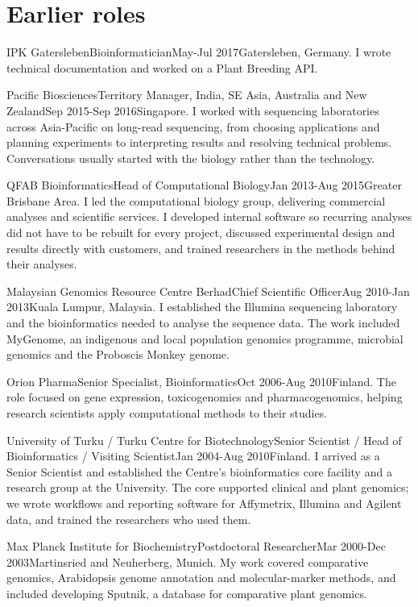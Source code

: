 \documentclass{vitae}
\begin{document}
\section{Earlier roles}
\begin{CvEntry}{IPK Gatersleben}{Bioinformatician}{May-Jul 2017}{Gatersleben, Germany. I wrote technical documentation and worked on a Plant Breeding API.}\end{CvEntry}
\begin{CvEntry}{Pacific Biosciences}{Territory Manager, India, SE Asia, Australia and New Zealand}{Sep 2015-Sep 2016}{Singapore. I worked with sequencing laboratories across Asia-Pacific on long-read sequencing, from choosing applications and planning experiments to interpreting results and resolving technical problems. Conversations usually started with the biology rather than the technology.}\end{CvEntry}
\clearpage\pagestyle{fancy}\thispagestyle{fancy}\vspace*{4mm}
\begin{CvEntry}{QFAB Bioinformatics}{Head of Computational Biology}{Jan 2013-Aug 2015}{Greater Brisbane Area. I led the computational biology group, delivering commercial analyses and scientific services. I developed internal software so recurring analyses did not have to be rebuilt for every project, discussed experimental design and results directly with customers, and trained researchers in the methods behind their analyses.}\end{CvEntry}
\begin{CvEntry}{Malaysian Genomics Resource Centre Berhad}{Chief Scientific Officer}{Aug 2010-Jan 2013}{Kuala Lumpur, Malaysia. I established the Illumina sequencing laboratory and the bioinformatics needed to analyse the sequence data. The work included MyGenome, an indigenous and local population genomics programme, microbial genomics and the Proboscis Monkey genome.}\end{CvEntry}
\begin{CvEntry}{Orion Pharma}{Senior Specialist, Bioinformatics}{Oct 2006-Aug 2010}{Finland. The role focused on gene expression, toxicogenomics and pharmacogenomics, helping research scientists apply computational methods to their studies.}\end{CvEntry}
\begin{CvEntry}{University of Turku / Turku Centre for Biotechnology}{Senior Scientist / Head of Bioinformatics / Visiting Scientist}{Jan 2004-Aug 2010}{Finland. I arrived as a Senior Scientist and established the Centre's bioinformatics core facility and a research group at the University. The core supported clinical and plant genomics; we wrote workflows and reporting software for Affymetrix, Illumina and Agilent data, and trained the researchers who used them.}\end{CvEntry}
\begin{CvEntry}{Max Planck Institute for Biochemistry}{Postdoctoral Researcher}{Mar 2000-Dec 2003}{Martinsried and Neuherberg, Munich. My work covered comparative genomics, Arabidopsis genome annotation and molecular-marker methods, and included developing Sputnik, a database for comparative plant genomics.}\end{CvEntry}
\end{document}
